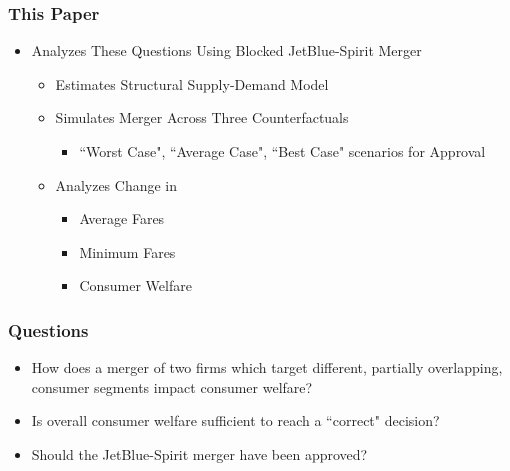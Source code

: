 \documentclass[xcolor=dvipsnames]{beamer}
\begin{document}
    \begin{frame}
        \frametitle{This Paper}
        \begin{itemize}
            \item Analyzes These Questions Using Blocked JetBlue-Spirit Merger
            \begin{itemize}
                \item Estimates Structural Supply-Demand Model
                \item Simulates Merger Across Three Counterfactuals
                \begin{itemize}
                \item ``Worst Case", ``Average Case", ``Best Case" scenarios for Approval
                \end{itemize}   
                \item Analyzes Change in 
                \begin{itemize}
                    \item Average Fares
                    \item Minimum Fares 
                    \item Consumer Welfare
                \end{itemize}
            \end{itemize}
        \end{itemize}
    \end{frame}

    \begin{frame}
        \frametitle{Questions}
        \begin{itemize}
             \item How does a merger of two firms which target different, partially overlapping, consumer segments impact consumer welfare?
            \item Is overall consumer welfare sufficient to reach a ``correct" decision?
            \item Should the JetBlue-Spirit merger have been approved?
        \end{itemize}
    \end{frame}
\end{document}
